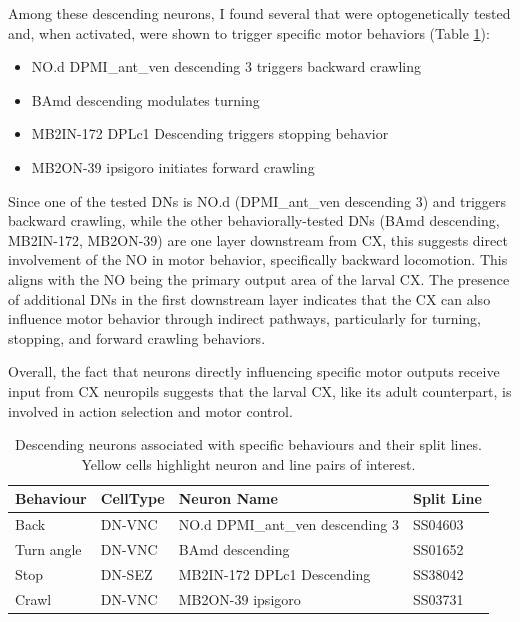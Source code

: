    Among these descending neurons, I found several that were optogenetically tested and, when activated, were shown to trigger specific motor behaviors (Table \ref{behaviourCXdescending}): 
    \begin{itemize}
        \item NO.d DPMI\_ant\_ven descending 3 triggers backward crawling
        \item BAmd descending modulates turning
        \item MB2IN-172 DPLc1 Descending triggers stopping behavior
        \item MB2ON-39 ipsigoro initiates forward crawling
    \end{itemize}

    Since one of the tested DNs is NO.d (DPMI\_ant\_ven descending 3) and triggers backward crawling, while the other behaviorally-tested DNs (BAmd descending, MB2IN-172, MB2ON-39) are one layer downstream from CX, this suggests direct involvement of the NO in motor behavior, specifically backward locomotion. This aligns with the NO being the primary output area of the larval CX. The presence of additional DNs in the first downstream layer indicates that the CX can also influence motor behavior through indirect pathways, particularly for turning, stopping, and forward crawling behaviors.

    Overall, the fact that neurons directly influencing specific motor outputs receive input from CX neuropils suggests that the larval CX, like its adult counterpart, is involved in action selection and motor control.

    \begin{table}[H]
        \centering
        \begin{tabular}{l l p{} l}
            \toprule
            \textbf{Behaviour} & \textbf{CellType} & \textbf{Neuron Name} & \textbf{Split Line} \\
            \midrule
            Back & DN-VNC & \cellcolor{cxhl} NO.d DPMI\_ant\_ven descending 3 & \cellcolor{cxhl} SS04603 \\
            Turn angle & DN-VNC & \cellcolor{cxhl} BAmd descending & \cellcolor{cxhl} SS01652 \\
            Stop & DN-SEZ & \cellcolor{cxhl} MB2IN-172 DPLc1 Descending & \cellcolor{cxhl} SS38042 \\
            Crawl & DN-VNC & \cellcolor{cxhl} MB2ON-39 ipsigoro & \cellcolor{cxhl} SS03731 \\
            \bottomrule
        \end{tabular}
        \caption[Behaviour of CX Descending Neurons]{Descending neurons associated with specific behaviours and their split lines. Yellow cells highlight neuron and line pairs of interest.}
        \label{behaviourCXdescending}
    \end{table}


